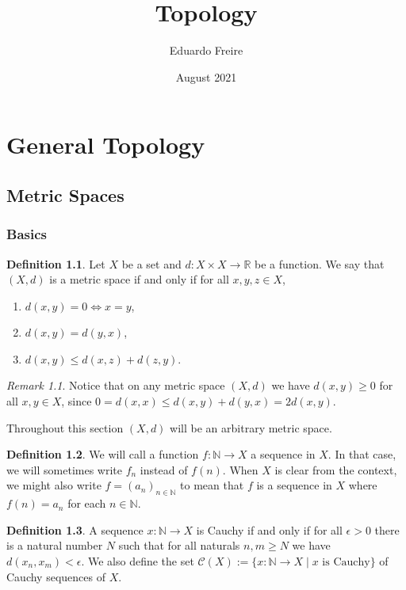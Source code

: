 \documentclass{report}
\title{Topology}
\author{Eduardo Freire}
\date{August 2021}
\theoremstyle{definition}
\newtheorem{definition}{Definition}[section]
\theoremstyle{remark}
\newtheorem{remark}{Remark}[section]
\newcommand{\N}{\mathbb{N}}
\newcommand{\R}{\mathbb{R}}
\newcommand{\set}[1]{\{#1\}}
\newcommand{\seq}[2][n \in \N]{\left( #2 \right)_{#1}}
\newcommand{\prt}[1]{\mathcal{#1}}
\begin{document}
\maketitle
\tableofcontents

\part{General Topology}
\chapter{Metric Spaces}
\section{Basics}

\begin{definition}
   Let $X$ be a set and $d: X \times X \to \R$ be a function. We say that $(X, d)$ is a metric space if and only if for all $x,y,z \in X$,
   \begin{enumerate}
       \item $d(x, y) = 0 \iff x = y$,
       \item $d(x, y) = d(y, x)$,
       \item $d(x, y) \leq d(x, z) + d(z, y)$.
   \end{enumerate}
\end{definition}

\begin{remark}
    Notice that on any metric space $(X, d)$ we have $d(x, y) \geq 0$ for all $x, y \in X$, since
    $0 = d(x, x) \leq d(x, y) + d(y, x) = 2 d(x, y)$.
\end{remark}

Throughout this section $(X, d)$ will be an arbitrary metric space.

\begin{definition}
   We will call a function $f : \N \to X$ a sequence in $X$. In that case, we will sometimes write $f_n$ instead of $f(n)$. When $X$ is clear from the context, we might also write $f = \seq{a_n}$ to mean that $f$ is a sequence in $X$ where $f(n) = a_n$ for each $n \in \N$.
\end{definition}

\begin{definition}
   A sequence $x: \N \to X$ is Cauchy if and only if for all $\epsilon > 0$ there is a natural number $N$ such that for all naturals $n,m \geq N$ we have $d(x_n, x_m) < \epsilon$. We also define the set $\prt{C}(X) := \set{x: \N \to X \mid \text{$x$ is Cauchy}}$ of Cauchy sequences of $X$.
\end{definition}
\end{document}
